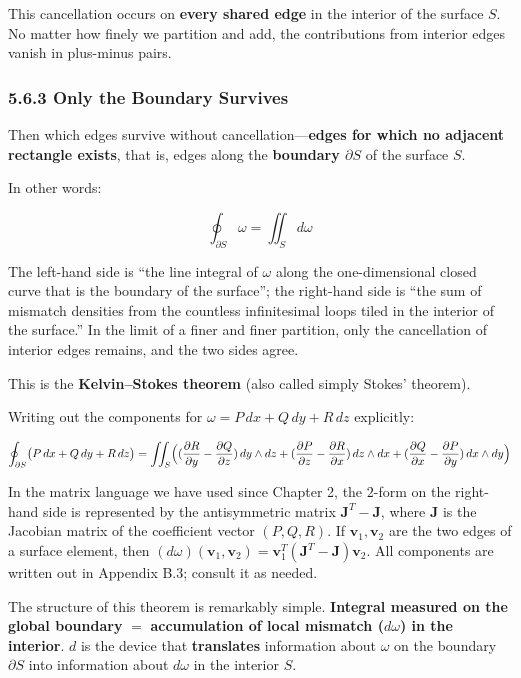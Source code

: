 \documentclass[a4paper,12pt,openany]{book}
\begin{document}
This cancellation occurs on \textbf{every shared edge} in the interior
of the surface \(S\). No matter how finely we partition and add, the
contributions from interior edges vanish in plus-minus pairs.

\hypertarget{only-the-boundary-survives}{%
\subsubsection{5.6.3 Only the Boundary
Survives}\label{only-the-boundary-survives}}

Then which edges survive without
cancellation—\textbf{edges for which no adjacent rectangle exists},
that is, edges along the \textbf{boundary $\partial S$} of the surface
\(S\).

In other words:

\[\oint_{\partial S} \omega = \iint_S d\omega\]

The left-hand side is ``the line integral of \(\omega\) along the
one-dimensional closed curve that is the boundary of the surface''; the
right-hand side is ``the sum of mismatch densities from the countless
infinitesimal loops tiled in the interior of the surface.'' In the limit
of a finer and finer partition, only the cancellation of interior edges
remains, and the two sides agree.

This is the \textbf{Kelvin–Stokes theorem} (also called simply Stokes'
theorem).

Writing out the components for \(\omega = P\,dx + Q\,dy + R\,dz\)
explicitly:

\[\oint_{\partial S} \bigl(P\,dx + Q\,dy + R\,dz\bigr) = \iint_S \Bigl( (\frac{\partial R}{\partial y} - \frac{\partial Q}{\partial z})\,dy \wedge dz + (\frac{\partial P}{\partial z} - \frac{\partial R}{\partial x})\,dz \wedge dx + (\frac{\partial Q}{\partial x} - \frac{\partial P}{\partial y})\,dx \wedge dy \Bigr)\]

In the matrix language we have used since Chapter 2, the \(2\)-form on
the right-hand side is represented by the antisymmetric matrix
\(\mathbf{J}^T - \mathbf{J}\), where \(\mathbf{J}\) is the Jacobian
matrix of the coefficient vector \((P,Q,R)\). If
\(\mathbf{v}_1, \mathbf{v}_2\) are the two edges of a surface element,
then
\((d\omega)(\mathbf{v}_1, \mathbf{v}_2) = \mathbf{v}_1^T(\mathbf{J}^T - \mathbf{J})\mathbf{v}_2\).
All components are written out in Appendix B.3; consult it as needed.

The structure of this theorem is remarkably simple.
\textbf{Integral measured on the global boundary} \(=\)
\textbf{accumulation of local mismatch ($d\omega$) in the interior}.
\(d\) is the device that \textbf{translates} information about
\(\omega\) on the boundary \(\partial S\) into information about
\(d\omega\) in the interior \(S\).
\end{document}
